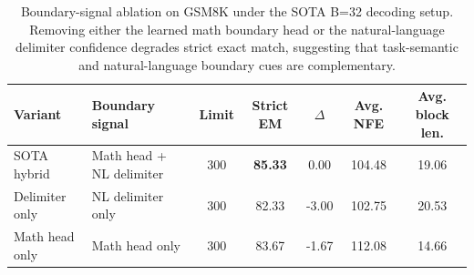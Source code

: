 \begin{table}[t]
\centering
\small
\begin{tabular}{l l c c c c c}
\toprule
Variant & Boundary signal & Limit & Strict EM & $\Delta$ & Avg. NFE & Avg. block len. \\
\midrule
SOTA hybrid & Math head + NL delimiter & 300 & \textbf{85.33} & 0.00 & 104.48 & 19.06 \\
Delimiter only & NL delimiter only & 300 & 82.33 & -3.00 & 102.75 & 20.53 \\
Math head only & Math head only & 300 & 83.67 & -1.67 & 112.08 & 14.66 \\
\bottomrule
\end{tabular}
\caption{Boundary-signal ablation on GSM8K under the SOTA B=32 decoding setup. Removing either the learned math boundary head or the natural-language delimiter confidence degrades strict exact match, suggesting that task-semantic and natural-language boundary cues are complementary.}
\label{tab:gsm8k-boundary-ablation}
\end{table}

